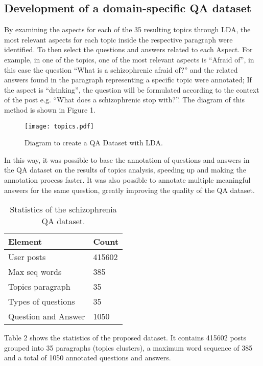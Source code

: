 \documentclass[runningheads]{llncs}
\begin{document}
\subsection{Development of a domain-specific QA dataset}
By examining the aspects for each of the 35 resulting topics through LDA, the most relevant aspects for each topic inside the respective paragraph were identified. To then select the questions and answers related to each Aspect. For example, in one of the topics, one of the most relevant aspects is ``Afraid of'', in this case the question ``What is a schizophrenic afraid of?'' and the related answers found in the paragraph representing a specific topic were annotated; If the aspect is ``drinking'', the question will be formulated according to the context of the post e.g. ``What does a schizophrenic stop with?''. The diagram of this method is shown in Figure 1.

\begin{figure*}[tb]
    \centering
    \texttt{[image: topics.pdf]} 
    \caption{Diagram to create a QA Dataset with LDA.}
    \label{fig:my_label}
\end{figure*}

In this way, it was possible to base the annotation of questions and answers in the QA dataset on the results of topics analysis, speeding up and making the annotation process faster. It was also possible to annotate multiple meaningful answers for the same question, greatly improving the quality of the QA dataset.



\begin{table}
 \centering
\caption{Statistics of the schizophrenia QA dataset.}\label{tab1}
\begin{tabular}{|l|l|}
\hline
Element & Count \\
\hline
    User posts & 415602  \\
    Max seq words & 385\\
    Topics paragraph & 35 \\
    Types of questions & 35\\
    Question and Answer & 1050\\
\hline
\end{tabular}
\end{table}

Table 2 shows the statistics of the proposed dataset. It contains 415602 posts grouped into 35 paragraphs (topics clusters), a maximum word sequence of 385 and a total of 1050 annotated questions and answers.
\end{document}
